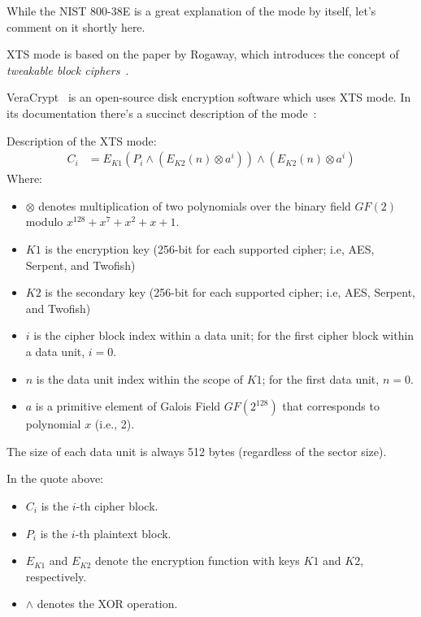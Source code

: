 While the NIST 800-38E is a great explanation of the mode by itself, let's comment on it shortly here.

XTS mode is based on the paper by Rogaway, which introduces the concept of \textit{tweakable block ciphers}~\cite{Rogaway}.

VeraCrypt~\cite{VeraCrypt} is an open-source disk encryption software which uses XTS mode.
In its documentation there's a succinct description of the mode~\cite{VeraCrypt-modes}:

\begin{fancyquote}
    Description of the XTS mode:
    \begin{align*}
        C_i &= E_{K1}(P_i \wedge (E_{K2}(n) \otimes a^i)) \wedge (E_{K2}(n) \otimes a^i)
    \end{align*}
    Where:
    \begin{itemize}
        \item $\otimes$ denotes multiplication of two polynomials over the binary field $GF(2)$ modulo $x^{128} + x^7 + x^2 + x + 1$.
        \item $K1$ is the encryption key (256-bit for each supported cipher; i.e, AES, Serpent, and Twofish)
        \item $K2$ is the secondary key (256-bit for each supported cipher; i.e, AES, Serpent, and Twofish)
        \item $i$ is the cipher block index within a data unit; for the first cipher block within a data unit, $i = 0$.
        \item $n$ is the data unit index within the scope of $K1$; for the first data unit, $n = 0$.
        \item $a$ is a primitive element of Galois Field $GF(2^{128})$ that corresponds to polynomial $x$ (i.e., 2).
    \end{itemize}
    The size of each data unit is always 512 bytes (regardless of the sector size).
\end{fancyquote}

In the quote above:
\begin{itemize}
    \item $C_i$ is the $i$-th cipher block.
    \item $P_i$ is the $i$-th plaintext block.
    \item $E_{K1}$ and $E_{K2}$ denote the encryption function with keys $K1$ and $K2$, respectively.
    \item $\wedge$ denotes the XOR operation.
\end{itemize}

